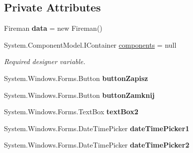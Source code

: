 \subsection*{Private Attributes}
\begin{DoxyCompactItemize}
\item 
\mbox{\label{class_statystyki___o_s_p_1_1_fireman_form_a6ab296f70d6f60cfb90e20ecf1ef502b}} 
Fireman {\bfseries data} = new Fireman()
\item 
System.\+Component\+Model.\+I\+Container \mbox{\hyperlink{class_statystyki___o_s_p_1_1_fireman_form_a69e8d0f2e55d8392c940ae92395fa920}{components}} = null
\begin{DoxyCompactList}\small\item\em Required designer variable. \end{DoxyCompactList}\item 
\mbox{\label{class_statystyki___o_s_p_1_1_fireman_form_a1f35ec861467c66173f8013b664080c0}} 
System.\+Windows.\+Forms.\+Button {\bfseries button\+Zapisz}
\item 
\mbox{\label{class_statystyki___o_s_p_1_1_fireman_form_a707c499570c1ae7358338ae85efa2392}} 
System.\+Windows.\+Forms.\+Button {\bfseries button\+Zamknij}
\item 
\mbox{\label{class_statystyki___o_s_p_1_1_fireman_form_a131daf231f1c063f6aac27acfb10b574}} 
System.\+Windows.\+Forms.\+Text\+Box {\bfseries text\+Box2}
\item 
\mbox{\label{class_statystyki___o_s_p_1_1_fireman_form_a363a62dfbee56fd787b2f788bfc0e310}} 
System.\+Windows.\+Forms.\+Date\+Time\+Picker {\bfseries date\+Time\+Picker1}
\item 
\mbox{\label{class_statystyki___o_s_p_1_1_fireman_form_a68a4e3088550dc1b982e51e64376a60d}} 
System.\+Windows.\+Forms.\+Date\+Time\+Picker {\bfseries date\+Time\+Picker2}
\item 
\mbox{\label{class_statystyki___o_s_p_1_1_fireman_form_ac799cfa7bdcc1530db57f2653f4a6c75}} 

\end{DoxyCompactItemize}
